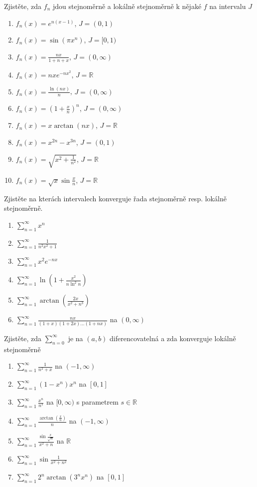 \begin{multicols}{2}
\separator

Zjistěte, zda $f_n$ jdou stejnoměrně a lokálně stejnoměrně k nějaké $f$ na intervalu $J$
\begin{enumerate}
\item $f_n(x) = e^{n (x-1)}$, $J = (0,1)$
\item $f_n(x) = \sin (\pi x^n)$, $J = [0,1)$
\item $f_n(x) = \frac{nx}{1+n+x}$, $J = (0,\infty)$
\item $f_n(x) = n x e^{-nx^2}$, $J = \mathbb{R}$
\item $f_n(x) = \frac{\ln (nx)}{n}$, $J = (0,\infty)$
\item $f_n(x) = \left( 1 + \frac{x}{n} \right)^n$, $J = (0,\infty)$
\item $f_n(x) = x \arctan (nx)$, $J = \mathbb{R}$
\item $f_n(x) = x^{2n} - x^{3n}$, $J = (0,1)$
\item $f_n(x) = \sqrt{x^2 + \frac{1}{n^2}}$, $J = \mathbb{R}$
\item $f_n(x) = \sqrt{x} \sin \frac{x}{n}$, $J = \mathbb{R}$
\end{enumerate}

\separator

Zjistěte na kterách intervalech konverguje řada stejnoměrně resp. lokálně stejnoměrně.
\begin{enumerate}
\item $\sum_{n = 1}^\infty x^n$
\item $\sum_{n = 1}^\infty \frac{1}{n^2 x^2 + 1}$
\item $\sum_{n = 1}^\infty x^2 e^{-nx}$
\item $\sum_{n = 1}^\infty \ln \left( 1 + \frac{x^2}{n \ln^2 n } \right)$
\item $\sum_{n = 1}^\infty \arctan \left( \frac{2x}{x^2 + n^3} \right)$
\item $\sum_{n = 1}^\infty \frac{nx}{(1+x)(1+2x)\ldots(1+nx)}$ na $(0,\infty)$
\end{enumerate}

\separator

Zjistěte, zda $\sum_{n=0}^{\infty}$ je na $(a,b)$ diferencovatelná a zda konverguje lokálně stejnoměrně
\begin{enumerate}
\item $\sum_{n=1}^\infty \frac{1}{n^2 + x}$ na $(-1, \infty)$
\item $\sum_{n=1}^\infty (1-x^n) x^n$ na $[0,1]$
\item $\sum_{n=1}^\infty \frac{x^n}{n^s}$ na $[0, \infty)$ s parametrem $s \in \mathbb{R}$
\item $\sum_{n=1}^\infty \frac{\arctan \left( \frac{x}{n} \right)}{n}$ na $(-1, \infty)$
\item $\sum_{n=1}^\infty \frac{\sin \frac{x}{\sqrt{n}}}{x^2 + n}$ na $\mathbb{R}$
\item $\sum_{n=1}^\infty \sin \frac{1}{x^2 + n^2}$
\item $\sum_{n=1}^\infty 2^n \arctan ( 3^n x^n )$ na $[0,1]$
\end{enumerate}


\end{multicols}
